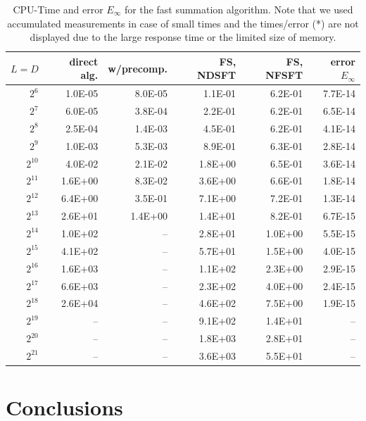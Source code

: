 \documentclass[11pt,a4paper,twoside,bibtotoc]{scrartcl}
\theoremstyle{plain}
\theoremstyle{definition}
\theoremstyle{remark}
\numberwithin{equation}{section}
\numberwithin{table}{section}
\numberwithin{figure}{section}
\begin{document}
\begin{table}[ht!]
  \begin{center}
    \begin{tabular}{r|r|r|r|r|r}
        $L = D$ & direct alg. & w/precomp. & FS, NDSFT & FS, NFSFT & error $E_{\infty}$\\\hline
           $2^6$ & 1.0E-05 & 8.0E-05 & 1.1E-01 & 6.2E-01 & 7.7E-14\\
           $2^7$ & 6.0E-05 & 3.8E-04 & 2.2E-01 & 6.2E-01 & 6.5E-14\\
           $2^8$ & 2.5E-04 & 1.4E-03 & 4.5E-01 & 6.2E-01 & 4.1E-14\\
           $2^9$ & 1.0E-03 & 5.3E-03 & 8.9E-01 & 6.3E-01 & 2.8E-14\\
      $2^{10}$ & 4.0E-02 & 2.1E-02 & 1.8E+00 & 6.5E-01 & 3.6E-14\\
      $2^{11}$ & 1.6E+00 & 8.3E-02 & 3.6E+00 & 6.6E-01 & 1.8E-14\\
      $2^{12}$ & 6.4E+00 & 3.5E-01 & 7.1E+00 & 7.2E-01 & 1.3E-14\\
      $2^{13}$ & 2.6E+01 & 1.4E+00 & 1.4E+01 & 8.2E-01 & 6.7E-15\\
     $2^{14}$ & 1.0E+02 & -- & 2.8E+01 & 1.0E+00 & 5.5E-15\\
     $2^{15}$ & 4.1E+02 & -- & 5.7E+01 & 1.5E+00 & 4.0E-15\\
     $2^{16}$ & 1.6E+03 & -- & 1.1E+02 & 2.3E+00 & 2.9E-15\\
     $2^{17}$ & 6.6E+03 & -- & 2.3E+02 & 4.0E+00 & 2.4E-15\\
     $2^{18}$ & 2.6E+04 & -- & 4.6E+02 & 7.5E+00 & 1.9E-15\\
     $2^{19}$ & -- & -- & 9.1E+02 & 1.4E+01 & --\\
     $2^{20}$ & -- & -- & 1.8E+03 & 2.8E+01 & --\\
     $2^{21}$ & -- & -- & 3.6E+03 & 5.5E+01 & --\\
    \end{tabular}
  \end{center}
  \caption{CPU-Time and error $E_{\infty}$ for the fast summation algorithm.
    Note that we used accumulated measurements in case of small times and the
    times/error (*) are not displayed due to the large response time or the 
    limited size of memory.}
  \label{tab:TimeSpace}
\end{table}


\section{Conclusions}
\end{document}
